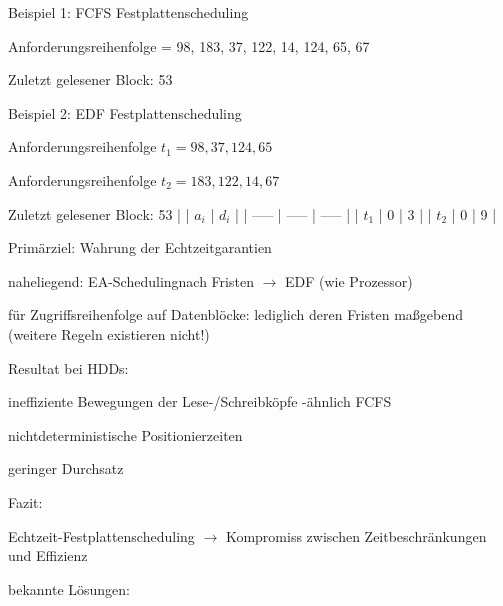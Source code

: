 \documentclass[a4paper]{article}
\begin{document}
\begin{multicols}{3}
    \begin{itemize*}
        \item Beispiel 1: FCFS Festplattenscheduling
        \begin{itemize*}
            \item Anforderungsreihenfolge = 98, 183, 37, 122, 14, 124, 65, 67
            \item Zuletzt gelesener Block: 53
        \end{itemize*}
        \item Beispiel 2: EDF Festplattenscheduling
        \begin{itemize*}
            \item Anforderungsreihenfolge $t_1 = 98, 37, 124, 65$
            \item Anforderungsreihenfolge $t_2 = 183, 122, 14, 67$
            \item Zuletzt gelesener Block: 53 | | $a_i$ | $d_i$ | | ----- | ----- | ----- | | $t_1$ | 0 | 3 | | $t_2$ | 0 | 9 |
        \end{itemize*}
        \item Primärziel: Wahrung der Echtzeitgarantien
        \begin{itemize*}
            \item naheliegend: EA-Schedulingnach Fristen $\rightarrow$ EDF (wie Prozessor)
            \item für Zugriffsreihenfolge auf Datenblöcke: lediglich deren Fristen maßgebend (weitere Regeln existieren nicht!)
        \end{itemize*}
        \item Resultat bei HDDs:
        \begin{itemize*}
            \item ineffiziente Bewegungen der Lese-/Schreibköpfe -ähnlich FCFS
            \item nichtdeterministische Positionierzeiten
            \item geringer Durchsatz
        \end{itemize*}
        \item Fazit:
        \begin{itemize*}
            \item Echtzeit-Festplattenscheduling $\rightarrow$ Kompromiss zwischen Zeitbeschränkungen und Effizienz
        \end{itemize*}
        \item bekannte Lösungen:
        \begin{enumerate*}


\end{enumerate*}
\end{itemize*}
\end{multicols}
\end{document}
